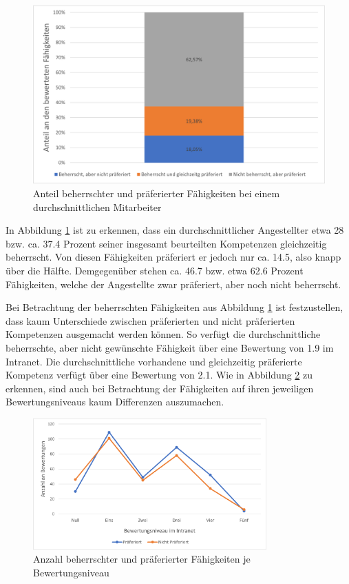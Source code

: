\begin{figure}[h]
	\centering
	\includegraphics[width=1\textwidth]{gfx/auswertung-anteil-an-faehigkeiten.png}
	\caption{Anteil beherrschter und präferierter Fähigkeiten bei einem durchschnittlichen Mitarbeiter}
	\label{fig:ergebnisse:analyse:abb3}
\end{figure}

In Abbildung \ref{fig:ergebnisse:analyse:abb3} ist zu erkennen, dass ein durchschnittlicher Angestellter etwa 28 bzw. ca. 37.4 Prozent seiner insgesamt beurteilten Kompetenzen gleichzeitig beherrscht. Von diesen Fähigkeiten präferiert er jedoch nur ca. 14.5, also knapp über die Hälfte. Demgegenüber stehen ca. 46.7 bzw. etwa 62.6 Prozent Fähigkeiten, welche der Angestellte zwar präferiert, aber noch nicht beherrscht.

Bei Betrachtung der beherrschten Fähigkeiten aus Abbildung \ref{fig:ergebnisse:analyse:abb3} ist festzustellen, dass kaum Unterschiede zwischen präferierten und nicht präferierten Kompetenzen ausgemacht werden können. So verfügt die durchschnittliche beherrschte, aber nicht gewünschte Fähigkeit über eine Bewertung von 1.9 im Intranet. Die durchschnittliche vorhandene und gleichzeitig präferierte Kompetenz verfügt über eine Bewertung von 2.1. Wie in Abbildung \ref{fig:ergebnisse:analyse:abb4} zu erkennen, sind auch bei Betrachtung der Fähigkeiten auf ihren jeweiligen Bewertungsniveaus kaum Differenzen auszumachen.

\begin{figure}[h]
	\centering
	\includegraphics[width=0.8\textwidth]{gfx/bewertungen-je-bewertungsniveau.png}
	\caption{Anzahl beherrschter und präferierter Fähigkeiten je Bewertungsniveau}
	\label{fig:ergebnisse:analyse:abb4}
\end{figure}

